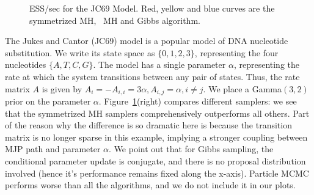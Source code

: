 {\begin{figure}
\begin{minipage}[!hp]{0.46\linewidth}
    \vspace{-0.6in}
    \caption{ESS/sec for the JC69 Model. Red, yellow and blue curves are the 
      symmetrized MH, \naive\ MH and Gibbs algorithm. }
     \label{fig:ESS_JC}
  \end{minipage}
  \end{figure}
  The Jukes and Cantor (JC69) model is a popular model of DNA nucleotide
  substitution.  We write its state space as $\{0, 1, 2, 3\}$, representing the 
  four nucleotides $\{A, T, C, G\}$.  The model has a single parameter $\alpha$, 
  representing the rate at which the system transitions between any pair of 
  states. Thus, the rate matrix $A$ is given by 
$A_i = -A_{i,i} = 3\alpha, A_{i, j} = \alpha,i \neq j.$
We place a Gamma$(3,2)$ prior on the parameter $\alpha$.
Figure~\ref{fig:ESS_JC}(right) compares different samplers: we see that the
symmetrized MH samplers comprehensively outperforms all others.
Part of the reason why the difference is so dramatic here is because the
transition matrix is no longer sparse in this example, implying a stronger
coupling between MJP path and parameter $\alpha$. We point out that for Gibbs
sampling, the conditional parameter update is conjugate, and there is no
proposal distribution involved (hence it's performance remains fixed along
the x-axis). Particle MCMC performs worse
than all the algorithms, and we do not include it in our plots.

}
